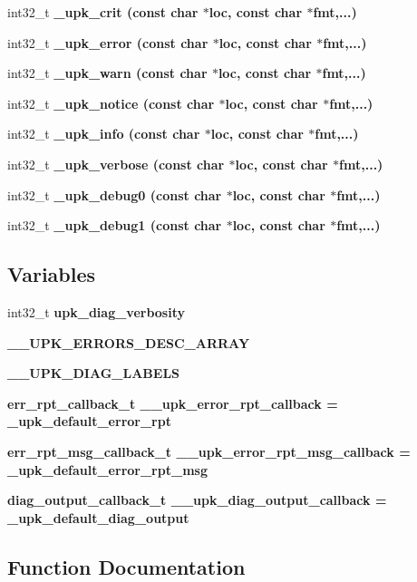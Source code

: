 \begin{CompactItemize}
\item 
int32\_\-t \bf{\_\-upk\_\-crit} (const char $\ast$loc, const char $\ast$fmt,...)
\item 
int32\_\-t \bf{\_\-upk\_\-error} (const char $\ast$loc, const char $\ast$fmt,...)
\item 
int32\_\-t \bf{\_\-upk\_\-warn} (const char $\ast$loc, const char $\ast$fmt,...)
\item 
int32\_\-t \bf{\_\-upk\_\-notice} (const char $\ast$loc, const char $\ast$fmt,...)
\item 
int32\_\-t \bf{\_\-upk\_\-info} (const char $\ast$loc, const char $\ast$fmt,...)
\item 
int32\_\-t \bf{\_\-upk\_\-verbose} (const char $\ast$loc, const char $\ast$fmt,...)
\item 
int32\_\-t \bf{\_\-upk\_\-debug0} (const char $\ast$loc, const char $\ast$fmt,...)
\item 
int32\_\-t \bf{\_\-upk\_\-debug1} (const char $\ast$loc, const char $\ast$fmt,...)
\end{CompactItemize}
\subsection*{Variables}
\begin{CompactItemize}
\item 
int32\_\-t \bf{upk\_\-diag\_\-verbosity}
\item 
\bf{\_\-\_\-UPK\_\-ERRORS\_\-DESC\_\-ARRAY}
\item 
\bf{\_\-\_\-UPK\_\-DIAG\_\-LABELS}
\item 
\bf{err\_\-rpt\_\-callback\_\-t} \bf{\_\-\_\-upk\_\-error\_\-rpt\_\-callback} = \_\-upk\_\-default\_\-error\_\-rpt
\item 
\bf{err\_\-rpt\_\-msg\_\-callback\_\-t} \bf{\_\-\_\-upk\_\-error\_\-rpt\_\-msg\_\-callback} = \_\-upk\_\-default\_\-error\_\-rpt\_\-msg
\item 
\bf{diag\_\-output\_\-callback\_\-t} \bf{\_\-\_\-upk\_\-diag\_\-output\_\-callback} = \_\-upk\_\-default\_\-diag\_\-output
\end{CompactItemize}


\subsection{Function Documentation}
